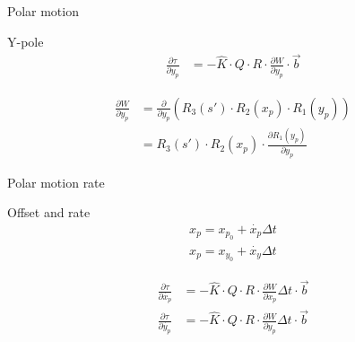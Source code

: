 \documentclass[14pt,table,t, c]{beamer}
\begin{document}
\begin{frame}{Polar motion}
\begin{block}{Y-pole}
\vspace*{-\baselineskip}\setlength\belowdisplayskip{0pt}\setlength\abovedisplayskip{0pt}
\begin{align*}
\frac{\partial \tau}{\partial y_p} &= - \hat{K} \cdot Q \cdot R \cdot \frac{\partial W}{\partial y_p}
\cdot \vec{b}
\end{align*}
\end{block}
\begin{block}{\vspace*{-3ex}}
\vspace*{-\baselineskip}\setlength\belowdisplayskip{0pt}\setlength\abovedisplayskip{5pt}
\begin{align*}
\frac{\partial W}{\partial y_p} &= \frac{\partial }{\partial y_p} (R_3(s') \cdot R_2(x_p) \cdot R_1(y_p)) \\
&= R_3(s') \cdot R_2(x_p) \cdot  \frac{\partial R_1(y_p)}{\partial y_p} 
\end{align*}
\end{block}
\end{frame}

\begin{frame}{Polar motion rate}
\begin{block}{Offset and rate}
\vspace*{-\baselineskip}\setlength\belowdisplayskip{0pt}\setlength\abovedisplayskip{5pt}
\begin{align*}
x_p = x_{p_0} + \dot{x_p}\Delta t \\
x_p = x_{y_0} + \dot{x_y}\Delta t
\end{align*}
\end{block}
\begin{block}{\vspace*{-3ex}}
\vspace*{-\baselineskip}\setlength\belowdisplayskip{0pt}\setlength\abovedisplayskip{0pt}
\begin{align*}
\frac{\partial \tau}{\partial \dot{x_p}} &= - \hat{K} \cdot Q \cdot R \cdot \frac{\partial W}{\partial x_p} \Delta t
\cdot \vec{b}\\
\frac{\partial \tau}{\partial \dot{y_p}} &= - \hat{K} \cdot Q \cdot R \cdot \frac{\partial W}{\partial y_p} \Delta t \cdot \vec{b}
\end{align*}
\end{block}
\end{frame}
\end{document}
